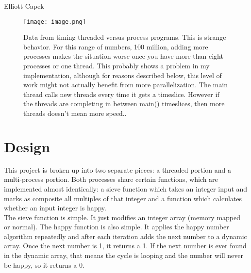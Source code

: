 \documentclass[11pt]{article}
\begin{document}
Elliott Capek \\

\begin{figure}[h!]
\centering
\texttt{[image: image.png]}
\caption{Data from timing threaded versus process programs. This is strange behavior. For this range of numbers, 100 million, adding more processes makes the situation worse once you have more than eight processes or one thread. This probably shows a problem in my implementation, although for reasons described below, this level of work might not actually benefit from more parallelization. The main thread calls new threads every time it gets a timeslice. However if the threads are completing in between main() timeslices, then more threads doesn't mean more speed..}
\end{figure}

\section{Design}
This project is broken up into two separate pieces: a threaded portion and a multi-process portion. Both processes share certain functions, which are implemented almost identically: a sieve function which takes an integer input and marks as composite all multiples of that integer and a function which calculates whether an input integer is happy.\\

The sieve function is simple. It just modifies an integer array (memory mapped or normal). The happy function is also simple. It applies the happy number algorithm repeatedly and after each iteration adds the next number to a dynamic array. Once the next number is 1, it returns a 1. If the next number is ever found in the dynamic array, that means the cycle is looping and the number will never be happy, so it returns a 0.\\
\end{document}
